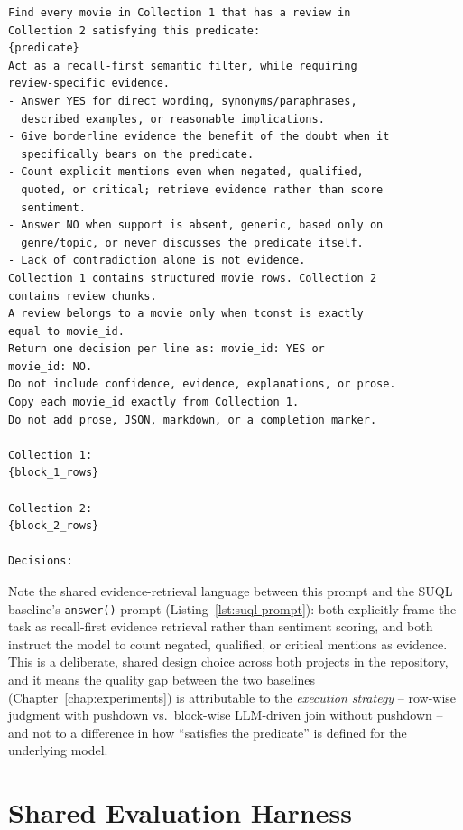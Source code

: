 \begin{lstlisting}[style=prompt, caption={Block-join prompt, verbatim from \texttt{project Trummer/baseline/trummer\_join/operators.py} (\texttt{create\_prompt}).}, label={lst:trummer-prompt}]
Find every movie in Collection 1 that has a review in
Collection 2 satisfying this predicate:
{predicate}
Act as a recall-first semantic filter, while requiring
review-specific evidence.
- Answer YES for direct wording, synonyms/paraphrases,
  described examples, or reasonable implications.
- Give borderline evidence the benefit of the doubt when it
  specifically bears on the predicate.
- Count explicit mentions even when negated, qualified,
  quoted, or critical; retrieve evidence rather than score
  sentiment.
- Answer NO when support is absent, generic, based only on
  genre/topic, or never discusses the predicate itself.
- Lack of contradiction alone is not evidence.
Collection 1 contains structured movie rows. Collection 2
contains review chunks.
A review belongs to a movie only when tconst is exactly
equal to movie_id.
Return one decision per line as: movie_id: YES or
movie_id: NO.
Do not include confidence, evidence, explanations, or prose.
Copy each movie_id exactly from Collection 1.
Do not add prose, JSON, markdown, or a completion marker.

Collection 1:
{block_1_rows}

Collection 2:
{block_2_rows}

Decisions:
\end{lstlisting}

Note the shared evidence-retrieval language between this prompt and the
SUQL baseline's \texttt{answer()} prompt (Listing~\ref{lst:suql-prompt}):
both explicitly frame the task as recall-first evidence retrieval rather
than sentiment scoring, and both instruct the model to count negated,
qualified, or critical mentions as evidence. This is a deliberate,
shared design choice across both projects in the repository, and it
means the quality gap between the two baselines (Chapter~\ref{chap:experiments})
is attributable to the \emph{execution strategy} -- row-wise judgment
with pushdown vs.\ block-wise LLM-driven join without pushdown -- and
not to a difference in how ``satisfies the predicate'' is defined for
the underlying model.

\section{Shared Evaluation Harness}
\label{sec:eval-harness}

